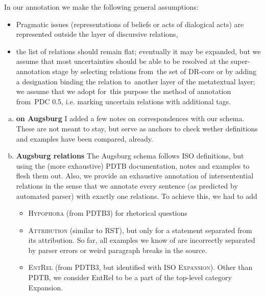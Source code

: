 \documentclass{udisc}
\begin{document}
\begin{itemize}
In our annotation we make the following general assumptions:

\begin{itemize}

\item Pragmatic issues (representations of beliefs or acts of
dialogical acts) are represented outside the layer of discursive relations,

\item the list of relations should remain flat; eventually it may be
expanded, but we assume that most uncertainties should be able to be
resolved at the super-annotation stage by selecting relations from~the set of
DR-core or by adding a designation binding the relation to~another layer of the
metatextual layer; we assume that we adopt for~this purpose the method of annotation from~PDC
0.5, i.e. marking uncertain relations with additional tags.

\end{itemize}


\begin{enumerate}[a)]
\item \textbf{on Augsburg} I added a few notes on correspondences with our schema. These are not meant to stay, but serve as anchors to check wether definitions and examples have been compared, already.

\item \textbf{Augsburg relations} The Augsburg schema follows ISO definitions, but using the (more exhaustive) PDTB documentation, notes and examples to flesh them out. Also, we provide an exhaustive annotation of intersentential relations in the sense that we annotate every sentence (as predicted by automated parser) with exactly one relations. To achieve this, we had to add 

      \begin{itemize}
      \item \textsc{Hypophora} (from PDTB3) for rhetorical questions
      \item \textsc{Attribution} (similar to RST), but only for a statement separated from its attribution. So far, all examples we know of are incorrectly separated by parser errors or weird paragraph breaks in the source.
      \item \textsc{EntRel} (from PDTB3, but identified with ISO \textsc{Expansion}). Other than PDTB, we consider EntRel to be a part of the top-level category Expansion.
      \end{itemize}


\end{enumerate}
\end{itemize}
\end{document}
